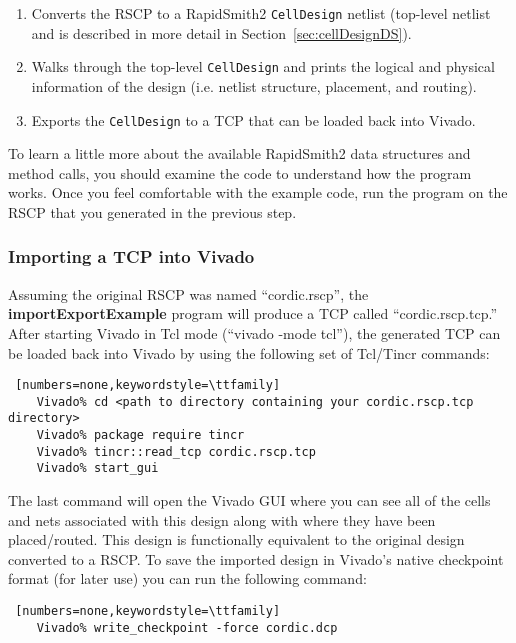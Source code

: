 \begin{enumerate}
  \item Converts the RSCP to a RapidSmith2 \texttt{CellDesign} netlist
  (top-level netlist and is described in more detail in Section~\ref{sec:cellDesignDS}).
  
  \item Walks through the top-level \texttt{CellDesign} and prints the logical
  and physical information of the design (i.e. netlist structure, placement,
  and routing).
  
  \item Exports the \texttt{CellDesign} to a TCP that can be loaded back into
  Vivado.
  
\end{enumerate}
 
\noindent To learn a little more about the available RapidSmith2 data structures
and method calls, you should examine the code to understand how the program
works. Once you feel comfortable with the example code, run the program on the
RSCP that you generated in the previous step. 

\subsubsection{Importing a TCP into Vivado}
Assuming the original RSCP was named ``cordic.rscp'', the
\textbf{importExportExample} program will produce a TCP called
``cordic.rscp.tcp.'' After starting Vivado in Tcl mode (``vivado -mode tcl''),
the generated TCP can be loaded back into Vivado by using the following set of
Tcl/Tincr commands:

\begin{lstlisting} [numbers=none,keywordstyle=\ttfamily]
	Vivado% cd <path to directory containing your cordic.rscp.tcp directory>
	Vivado% package require tincr
	Vivado% tincr::read_tcp cordic.rscp.tcp
	Vivado% start_gui
\end{lstlisting}

\noindent The last command will open the Vivado GUI where you can see all of the 
cells and nets associated with this design along with where they have been
placed/routed. This design is functionally equivalent to the original design
converted to a RSCP. To save the imported design in Vivado's native checkpoint
format (for later use) you can run the following command:

\begin{lstlisting} [numbers=none,keywordstyle=\ttfamily]
	Vivado% write_checkpoint -force cordic.dcp
\end{lstlisting}

